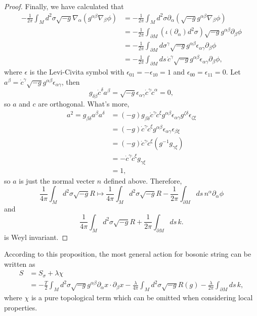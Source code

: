 \begin{proof}
Finally, we have calculated that
\begin{align*}
	-\frac{1}{2\pi}\int_Md^2\sigma \sqrt{-g}
	\nabla_\alpha(g^{\alpha\beta}\nabla_\beta \phi)
	&=-\frac{1}{2\pi}\int_Md^2\sigma
	\partial_\alpha(\sqrt{-g} g^{\alpha\beta}\nabla_\beta \phi)\\
	&=-\frac{1}{2\pi}\int_{\partial M}
	(\iota({\partial_\alpha})d^2\sigma)
\sqrt{-g} g^{\alpha\beta}\partial_\beta \phi\\
&=-\frac{1}{2\pi}\int_{\partial M}
	d\sigma^\gamma \sqrt{-g} g^{\alpha\beta}
	\epsilon_{\alpha\gamma}\partial_\beta \phi\\
&=-\frac{1}{2\pi}\int_{\partial M}
ds \,\dot c^\gamma \sqrt{-g} g^{\alpha\beta}
\epsilon_{\alpha\gamma}\partial_\beta \phi,
\end{align*}
where $\epsilon$ is the Levi-Civita symbol with 
$\epsilon_{01}=-\epsilon_{10}=1$ and $\epsilon_{00}=\epsilon_{11}=0$. 
Let $a^\beta=\dot c^\gamma \sqrt{-g} g^{\alpha\beta}
\epsilon_{\alpha\gamma}$, then 
\[
	g_{\delta\beta}\dot c^\delta a^\beta=\sqrt{-g}
	\epsilon_{\alpha\gamma}\dot c^\gamma\dot c^\alpha=0,
\]
so $a$ and $c$ are orthogonal. What's more,
\begin{align*}
	a^2=g_{\beta\delta}a^\beta a^\delta &=
	(-g)g_{\beta\delta}\dot c^\gamma \dot c^\xi  
	g^{\alpha\beta}\epsilon_{\alpha\gamma}
	g^{\zeta\delta}\epsilon_{\zeta\xi}\\
	&=(-g)\dot c^\gamma \dot c^\xi  
	g^{\alpha\beta}\epsilon_{\alpha\gamma}
	\epsilon_{\beta\xi}\\
	&=(-g)\dot c^\gamma \dot c^\xi
	(g^{-1}g_{\gamma\xi})\\
	&=-\dot c^\gamma \dot c^\xi g_{\gamma\xi}\\
	&=1,
\end{align*}
so $a$ is just the normal vecter $n$ defined above. Therefore,
\[
	\frac{1}{4\pi} \int_M d^2\sigma \sqrt{-g} R
	\longmapsto 
	\frac{1}{4\pi} \int_M d^2\sigma \sqrt{-g} R
	-\frac{1}{2\pi}\int_{\partial M}ds \, n^\alpha
\partial_\alpha\phi
\]
and 
\[
	\frac{1}{4\pi} \int_M d^2\sigma \sqrt{-g} R+
	\frac{1}{2\pi}\int_{\partial M}ds\, k.
\]
is Weyl invariant.
\end{proof}

According to this proposition, the most
general action for bosonic string can be written as
\begin{align*}
	S&=S_\sigma+\lambda \chi\\
&=-\frac{T}{2} \int_M d^2\sigma \sqrt{-g}
g^{\alpha\beta}\partial_\alpha x\cdot \partial_\beta x
-\frac{\lambda}{4\pi} \int_M d^2\sigma \sqrt{-g} R(g)-
\frac{\lambda}{2\pi}\int_{\partial M}ds\, k,
\end{align*}
where $\chi$ is a pure topological term which can be 
omitted when considering local properties.

